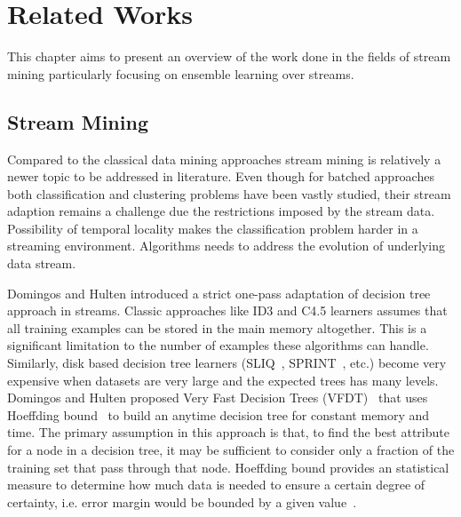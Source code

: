 \chapter{Related Works}
This chapter aims to present an overview of the work done in the fields of stream mining particularly focusing on ensemble learning over streams.

\section{Stream Mining}
Compared to the classical data mining approaches stream mining is relatively a newer topic to be addressed in literature. Even though for batched approaches both classification and clustering problems have been vastly studied, their stream adaption remains a challenge due the restrictions imposed by the stream data. Possibility of temporal locality makes the classification problem harder in a streaming environment. Algorithms needs to address the evolution of underlying data stream. 

Domingos and Hulten introduced a strict one-pass adaptation of decision tree~\cite{breiman84:dt,quinlan93:c45} approach in streams. Classic approaches like ID3 and C4.5 learners assumes that all training examples can be stored in the main memory altogether. This is a significant limitation to the number of examples these algorithms can handle. Similarly, disk based decision tree learners (SLIQ~\cite{mehta96:sliq}, SPRINT~\cite{shafer96:sprint}, etc.) become very expensive when datasets are very large and the expected trees has many levels. Domingos and Hulten proposed Very Fast Decision Trees (VFDT)~\cite{domingos00:vfdt} that uses Hoeffding bound~\cite{hoeffding63:bound} to build an anytime decision tree for constant memory and time. The primary assumption in this approach is that, to find the best attribute for a node in a decision tree, it may be sufficient to consider only a fraction of the training set that pass through that node. Hoeffding bound provides an statistical measure to determine how much data is needed to ensure a certain degree of certainty, i.e. error margin would be bounded by a given value~\cite{catlett91:thesis}.

